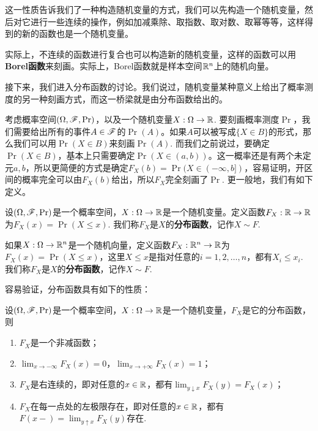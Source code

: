 这一性质告诉我们了一种构造随机变量的方式，我们可以先构造一个随机变量，然后对它进行一些连续的操作，例如加减乘除、取指数、取对数、取幂等等，这样得到的新的函数也是一个随机变量。

实际上，不连续的函数进行复合也可以构造新的随机变量，这样的函数可以用\textbf{Borel函数}来刻画。实际上，Borel函数就是样本空间$\mathbb{R}^n$上的随机向量。


接下来，我们进入分布函数的讨论。我们说过，随机变量某种意义上给出了概率测度的另一种刻画方式，而这一桥梁就是由分布函数给出的。

考虑概率空间$(\Omega,\mathscr{F},\Pr)$，以及一个随机变量$X:\Omega\to\mathbb{R}$. 要刻画概率测度$\Pr$，我们需要给出所有的事件$A\in\mathscr{F}$的$\Pr(A)$。如果$A$可以被写成$\{X\in B\}$的形式，那么我们可以用$\Pr(X\in B)$来刻画$\Pr(A)$. 而我们之前说过，要确定$\Pr(X\in B)$，基本上只需要确定$\Pr(X\in(a,b))$。这一概率还是有两个未定元$a,b$，所以更简便的方式是确定$F_X(b)=\Pr(X\in(-\infty,b])$，容易证明，开区间的概率完全可以由$F_X(b)$给出，所以$F_X$完全刻画了$\Pr$. 更一般地，我们有如下定义。

\begin{definition}[分布函数]
设$(\Omega,\mathscr{F},\Pr)$是一个概率空间，$X:\Omega\to\mathbb{R}$是一个随机变量。定义函数$F_X:\mathbb{R}\to\mathbb{R}$为$F_X(x) = \Pr(X\leq x)$. 我们称$F_X$是$X$的\textbf{分布函数}，记作$X\sim F$.

如果$X:\Omega\to\mathbb{R}^n$是一个随机向量，定义函数$F_X:\mathbb{R}^n\to\mathbb{R}$为$F_X(x) = \Pr(X\leq x)$，这里$X\leq x$是指对任意的$i=1,2,\ldots,n$，都有$X_i\leq x_i$. 我们称$F_X$是$X$的\textbf{分布函数}，记作$X\sim F$.
\end{definition}

容易验证，分布函数具有如下的性质：

\begin{proposition}\label{prop:distribution-function}
设$(\Omega,\mathscr{F},\Pr)$是一个概率空间，$X:\Omega\to\mathbb{R}$是一个随机变量，$F_X$是它的分布函数，则
\begin{enumerate}
    \item $F_X$是一个非减函数；
    \item $\lim_{x\to-\infty}F_X(x)=0$，$\lim_{x\to+\infty}F_X(x)=1$；
    \item $F_X$是右连续的，即对任意的$x\in\mathbb{R}$，都有$\lim_{y\downarrow x}F_X(y)=F_X(x)$；
    \item $F_X$在每一点处的左极限存在，即对任意的$x\in\mathbb{R}$，都有$F(x-)=\lim_{y\uparrow x}F_X(y)$存在.
\end{enumerate}
\end{proposition}

